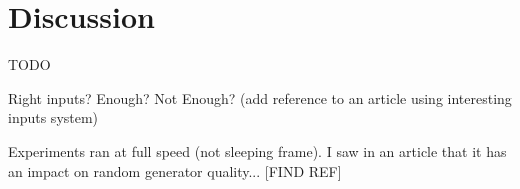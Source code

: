 \section{Discussion}\label{section:discussion}

TODO

Right inputs? Enough? Not Enough? (add reference to an article using interesting inputs system)

Experiments ran at full speed (not sleeping frame). I saw in an article that it has an impact on random generator quality... [FIND REF]

